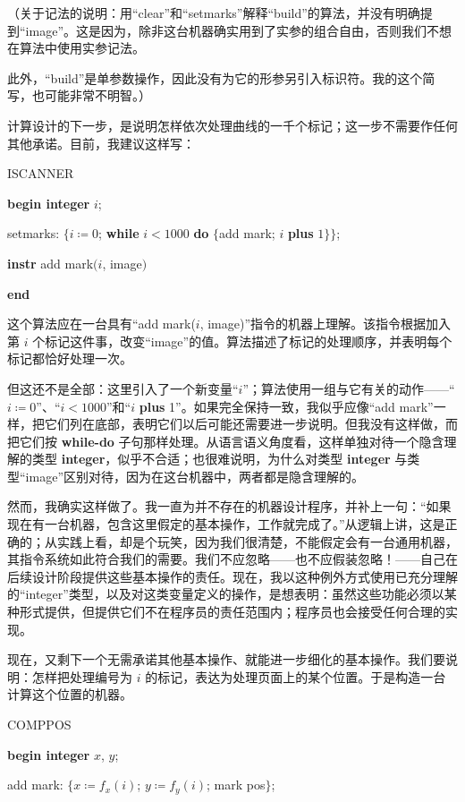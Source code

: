 （关于记法的说明：用“clear”和“setmarks”解释“build”的算法，并没有明确提到“image”。这是因为，除非这台机器确实用到了实参的组合自由，否则我们不想在算法中使用实参记法。

此外，“build”是单参数操作，因此没有为它的形参另引入标识符。我的这个简写，也可能非常不明智。）

计算设计的下一步，是说明怎样依次处理曲线的一千个标记；这一步不需要作任何其他承诺。目前，我建议这样写：

ISCANNER

\textbf{begin integer} $i$;

\quad setmarks: $\{i \coloneq 0$; \textbf{while} $i < 1000$ \textbf{do} $\{$add mark; $i$ \textbf{plus} $1\}\}$;

\quad \textbf{instr} add mark$(i$, image$)$

\textbf{end}

\noindent
这个算法应在一台具有“add mark($i$, image)”指令的机器上理解。该指令根据加入第 $i$ 个标记这件事，改变“image”的值。算法描述了标记的处理顺序，并表明每个标记都恰好处理一次。

但这还不是全部：这里引入了一个新变量“$i$”；算法使用一组与它有关的动作——“$i \coloneq 0$”、\mbox{“$i < 1000$”}和“$i$ \textbf{plus} 1”。如果完全保持一致，我似乎应像“add mark”一样，把它们列在底部，表明它们以后可能还需要进一步说明。但我没有这样做，而把它们按 \textbf{while-do} 子句那样处理。从语言语义角度看，这样单独对待一个隐含理解的类型 \textbf{integer}，似乎不合适；也很难说明，为什么对类型 \textbf{integer} 与类型“image”区别对待，因为在这台机器中，两者都是隐含理解的。

然而，我确实这样做了。我一直为并不存在的机器设计程序，并补上一句：“如果现在有一台机器，包含这里假定的基本操作，工作就完成了。”从逻辑上讲，这是正确的；从实践上看，却是个玩笑，因为我们很清楚，不能假定会有一台通用机器，其指令系统如此符合我们的需要。我们不应忽略——也不应假装忽略！——自己在后续设计阶段提供这些基本操作的责任。现在，我以这种例外方式使用已充分理解的“integer”类型，以及对这类变量定义的操作，是想表明：虽然这些功能必须以某种形式提供，但提供它们不在程序员的责任范围内；程序员也会接受任何合理的实现。

现在，又剩下一个无需承诺其他基本操作、就能进一步细化的基本操作。我们要说明：怎样把处理编号为 $i$ 的标记，表达为处理页面上的某个位置。于是构造一台计算这个位置的机器。

COMPPOS
\nopagebreak

\textbf{begin integer} $x$, $y$;

\nopagebreak

\quad add mark: $\{x \coloneq f_x(i)$; $y \coloneq f_y(i)$; mark pos$\}$;

